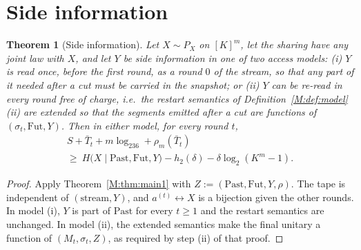\documentclass[aps,prx,twocolumn,superscriptaddress,nofootinbib,longbibliography]{revtex4-2}
\theoremstyle{plain}
\newtheorem{theorem}{Theorem}
\theoremstyle{definition}
\theoremstyle{remark}
\begin{document}
\section{Side information}\label{sec:side}

\begin{theorem}[Side information]\label{thm:side}
Let $X\sim P_X$ on $[K]^m$, let the sharing have any joint law with $X$, and let $Y$ be side information in one of two access models: (i) $Y$ is read once, before the first round, as a round $0$ of the stream, so that any part of it needed after a cut must be carried in the snapshot; or (ii) $Y$ can be re-read in every round free of charge, i.e.\ the restart semantics of Definition~\ref{M:def:model}(ii) are extended so that the segments emitted after a cut are functions of $(\sigma_t,\mathrm{Fut},Y)$. Then in either model, for every round $t$,
\begin{multline}
S+\bar T_t+m\log_236+\rho_m(\bar T_t)\\
\ge\ H\big(X\mid\mathrm{Past},\mathrm{Fut},Y\big)-h_2(\delta)-\delta\log_2(K^m-1).
\end{multline}
\end{theorem}
\begin{proof}
Apply Theorem~\ref{M:thm:main1} with $Z:=(\mathrm{Past},\mathrm{Fut},Y,\rho)$. The tape is independent of $(\text{stream},Y)$, and $a^{(t)}\leftrightarrow X$ is a bijection given the other rounds. In model (i), $Y$ is part of $\mathrm{Past}$ for every $t\ge1$ and the restart semantics are unchanged. In model (ii), the extended semantics make the final unitary a function of $(M_t,\sigma_t,Z)$, as required by step (ii) of that proof.
\end{proof}
\end{document}
